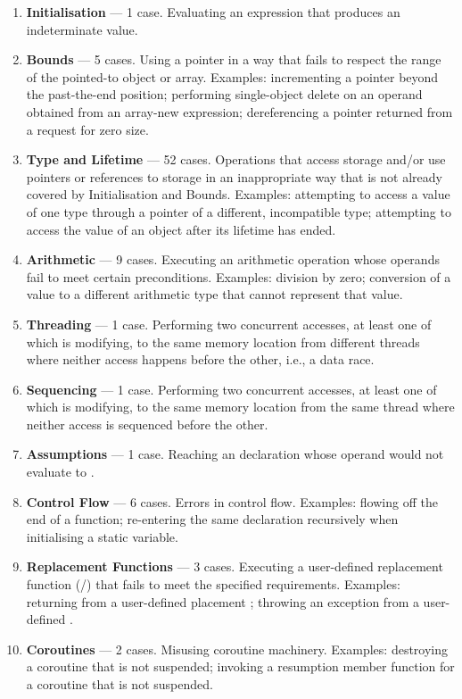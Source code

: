  \renewcommand{\labelenumi}{\Roman{enumi}.}
\begin{enumerate}
\item \textbf{Initialisation} --- 1 case. Evaluating an expression that produces an indeterminate value.
\item \textbf{Bounds} --- 5 cases. Using a pointer in a way that fails to respect the range of the pointed-to object or array. Examples: incrementing a pointer beyond the past-the-end position; performing single-object delete on an operand obtained from an array-new expression;  dereferencing a pointer returned from a request for zero size.
\item \textbf{Type and Lifetime} --- 52 cases. Operations that access storage and/or use pointers or references to storage in an inappropriate way that is not already covered by Initialisation and Bounds. Examples: attempting to access a value of one type through  a pointer of a different, incompatible type; attempting to access the value of an object after its lifetime has ended. 
\item \textbf{Arithmetic} --- 9 cases. Executing an arithmetic operation whose operands fail to meet certain preconditions. Examples: division by zero; conversion of a value to a different arithmetic type that cannot represent that value. 
\item \textbf{Threading} --- 1 case. Performing two concurrent accesses, at least one of which is modifying, to the same memory location from different threads where neither access happens before the other, i.e., a data race.
\item \textbf{Sequencing} --- 1 case. Performing two concurrent accesses, at least one of which is modifying, to the same memory location from the same thread where neither access is sequenced before the other.
\item \textbf{Assumptions} --- 1 case. Reaching an \tcode{[[assume]]} declaration whose operand would not evaluate to .
\item \textbf{Control Flow} --- 6 cases. Errors in control flow. Examples: flowing off the end of a function; re-entering the same declaration recursively when initialising a static variable.
\item \textbf{Replacement Functions} --- 3 cases. Executing a user-defined replacement function (/) that fails to meet the specified requirements. Examples: returning  from a user-defined placement ; throwing an exception from a user-defined .
\item \textbf{Coroutines} --- 2 cases. Misusing coroutine machinery. Examples: destroying a coroutine that is not suspended; invoking a resumption member function for a coroutine that is not suspended.
\end{enumerate}

